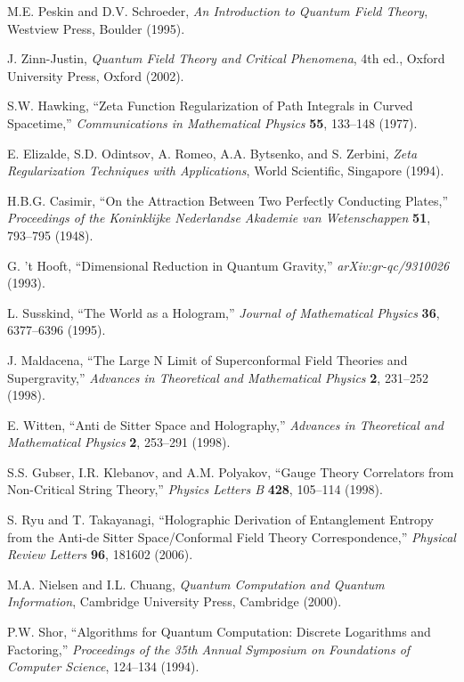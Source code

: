 \documentclass[11pt]{article}
\theoremstyle{plain}
\theoremstyle{definition}
\theoremstyle{remark}
\begin{document}
\begin{thebibliography}{99}
 M.E. Peskin and D.V. Schroeder, \emph{An Introduction to Quantum Field Theory}, Westview Press, Boulder (1995).

 J. Zinn-Justin, \emph{Quantum Field Theory and Critical Phenomena}, 4th ed., Oxford University Press, Oxford (2002).

 S.W. Hawking, ``Zeta Function Regularization of Path Integrals in Curved Spacetime,'' \emph{Communications in Mathematical Physics} \textbf{55}, 133--148 (1977).

 E. Elizalde, S.D. Odintsov, A. Romeo, A.A. Bytsenko, and S. Zerbini, \emph{Zeta Regularization Techniques with Applications}, World Scientific, Singapore (1994).

 H.B.G. Casimir, ``On the Attraction Between Two Perfectly Conducting Plates,'' \emph{Proceedings of the Koninklijke Nederlandse Akademie van Wetenschappen} \textbf{51}, 793--795 (1948).

 G. 't Hooft, ``Dimensional Reduction in Quantum Gravity,'' \emph{arXiv:gr-qc/9310026} (1993).

 L. Susskind, ``The World as a Hologram,'' \emph{Journal of Mathematical Physics} \textbf{36}, 6377--6396 (1995).

 J. Maldacena, ``The Large N Limit of Superconformal Field Theories and Supergravity,'' \emph{Advances in Theoretical and Mathematical Physics} \textbf{2}, 231--252 (1998).

 E. Witten, ``Anti de Sitter Space and Holography,'' \emph{Advances in Theoretical and Mathematical Physics} \textbf{2}, 253--291 (1998).

 S.S. Gubser, I.R. Klebanov, and A.M. Polyakov, ``Gauge Theory Correlators from Non-Critical String Theory,'' \emph{Physics Letters B} \textbf{428}, 105--114 (1998).

 S. Ryu and T. Takayanagi, ``Holographic Derivation of Entanglement Entropy from the Anti-de Sitter Space/Conformal Field Theory Correspondence,'' \emph{Physical Review Letters} \textbf{96}, 181602 (2006).

 M.A. Nielsen and I.L. Chuang, \emph{Quantum Computation and Quantum Information}, Cambridge University Press, Cambridge (2000).

 P.W. Shor, ``Algorithms for Quantum Computation: Discrete Logarithms and Factoring,'' \emph{Proceedings of the 35th Annual Symposium on Foundations of Computer Science}, 124--134 (1994).


\end{thebibliography}
\end{document}
